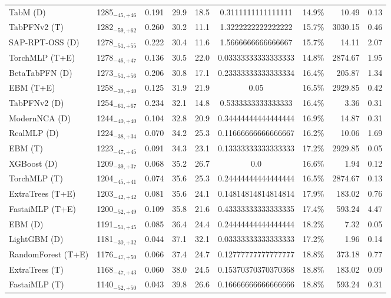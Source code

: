 \begin{tabular}{llcccccrr}
TabM (D) & 1285${}_{-45,+46}$ & 0.191 & 29.9 & 18.5 & 0.3111111111111111 & 14.9\% & 10.49 & 0.13 \\
TabPFNv2 (T) & 1282${}_{-59,+62}$ & 0.260 & 30.2 & 11.1 & 1.3222222222222222 & 15.7\% & 3030.15 & 0.46 \\
SAP-RPT-OSS (D) & 1278${}_{-51,+55}$ & 0.222 & 30.4 & 11.6 & 1.5666666666666667 & 15.7\% & 14.11 & 2.07 \\
TorchMLP (T+E) & 1278${}_{-46,+47}$ & 0.136 & 30.5 & 22.0 & 0.03333333333333333 & 14.8\% & 2874.67 & 1.95 \\
BetaTabPFN (D) & 1273${}_{-51,+56}$ & 0.206 & 30.8 & 17.1 & 0.23333333333333334 & 16.4\% & 205.87 & 1.34 \\
EBM (T+E) & 1258${}_{-39,+40}$ & 0.125 & 31.9 & 21.9 & 0.05 & 16.5\% & 2929.85 & 0.42 \\
TabPFNv2 (D) & 1254${}_{-61,+67}$ & 0.234 & 32.1 & 14.8 & 0.5333333333333333 & 16.4\% & 3.36 & 0.31 \\
ModernNCA (D) & 1244${}_{-40,+40}$ & 0.104 & 32.8 & 20.9 & 0.34444444444444444 & 16.9\% & 14.87 & 0.31 \\
RealMLP (D) & 1224${}_{-38,+34}$ & 0.070 & 34.2 & 25.3 & 0.11666666666666667 & 16.2\% & 10.06 & 1.69 \\
EBM (T) & 1223${}_{-47,+45}$ & 0.091 & 34.3 & 23.1 & 0.13333333333333333 & 17.2\% & 2929.85 & 0.05 \\
XGBoost (D) & 1209${}_{-39,+37}$ & 0.068 & 35.2 & 26.7 & 0.0 & 16.6\% & 1.94 & 0.12 \\
TorchMLP (T) & 1204${}_{-45,+41}$ & 0.074 & 35.6 & 25.3 & 0.24444444444444444 & 16.5\% & 2874.67 & 0.13 \\
ExtraTrees (T+E) & 1203${}_{-42,+42}$ & 0.081 & 35.6 & 24.1 & 0.14814814814814814 & 17.9\% & 183.02 & 0.76 \\
FastaiMLP (T+E) & 1200${}_{-52,+49}$ & 0.109 & 35.8 & 21.6 & 0.43333333333333335 & 17.4\% & 593.24 & 4.47 \\
EBM (D) & 1191${}_{-51,+45}$ & 0.085 & 36.4 & 24.4 & 0.24444444444444444 & 18.2\% & 7.32 & 0.05 \\
LightGBM (D) & 1181${}_{-30,+32}$ & 0.044 & 37.1 & 32.1 & 0.03333333333333333 & 17.2\% & 1.96 & 0.14 \\
RandomForest (T+E) & 1176${}_{-47,+50}$ & 0.066 & 37.4 & 24.7 & 0.12777777777777777 & 18.8\% & 373.18 & 0.77 \\
ExtraTrees (T) & 1168${}_{-47,+43}$ & 0.060 & 38.0 & 24.5 & 0.15370370370370368 & 18.8\% & 183.02 & 0.09 \\
FastaiMLP (T) & 1140${}_{-52,+50}$ & 0.043 & 39.8 & 26.6 & 0.16666666666666666 & 18.8\% & 593.24 & 0.31 \\

\end{tabular}
